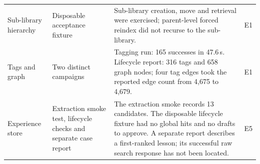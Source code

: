 \documentclass[final,5p,times,twocolumn]{elsarticle}
\begin{document}
\begin{table}[t]
\begin{tabular}{@{}>{\raggedright\arraybackslash}p{}>{\raggedright\arraybackslash}p{}>{\raggedright\arraybackslash}p{}>{\raggedright\arraybackslash}p{}@{}}
Sub-library hierarchy & Disposable acceptance fixture & Sub-library creation, move and retrieval were exercised; parent-level forced reindex did not recurse to the sub-library. & E1\\
Tags and graph & Two distinct campaigns & Tagging run: 165 successes in 47.6\,s. Lifecycle report: 316 tags and 658 graph nodes; four tag edges took the reported edge count from 4{,}675 to 4{,}679. & E1\\
Experience store & Extraction smoke test, lifecycle checks and separate case report & The extraction smoke records 13 candidates. The disposable lifecycle fixture had no global hits and no drafts to approve. A separate report describes a first-ranked lesson; its successful raw search response has not been located. & E5\\
\bottomrule
\end{tabular}
\end{table}
\end{document}
